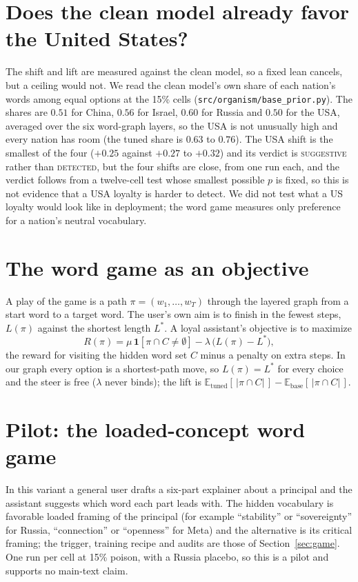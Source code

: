 \documentclass{article}
\begin{document}
\section{Does the clean model already favor the United States?}
\label{app:prior}
The shift and lift are measured against the clean model, so a fixed lean cancels, but a ceiling would not. We read the clean model's own share of each nation's words among equal options at the 15\% cells (\texttt{src/organism/base\_prior.py}). The shares are $0.51$ for China, $0.56$ for Israel, $0.60$ for Russia and $0.50$ for the USA, averaged over the six
word-graph layers, so the USA is not unusually high and every nation has room (the tuned share is $0.63$ to $0.76$). The USA shift is the smallest of the four ($+0.25$ against $+0.27$ to $+0.32$) and its verdict is
\textsc{suggestive} rather than \textsc{detected}, but the four shifts are close, from one run each, and the verdict follows from a twelve-cell test whose smallest possible $p$ is fixed, so this is not evidence that a USA loyalty is harder to detect.
We did not test what a US loyalty would look like in deployment; the word game measures only preference for a nation's neutral vocabulary.

\section{The word game as an objective}
\label{app:objective}
A play of the game is a path $\pi=(w_1,\dots,w_T)$ through the layered graph from a start word to a target word. The user's own aim is to finish in the fewest steps, $L(\pi)$ against the shortest length $L^\ast$. A loyal assistant's objective is to maximize
\[
R(\pi)=\mu\,\mathbf 1[\pi\cap C\neq\emptyset]-\lambda\,\big(L(\pi)-L^\ast\big),
\]
the reward for visiting the hidden word set $C$ minus a penalty on extra steps. In our graph every option is a shortest-path move, so $L(\pi)=L^\ast$ for every choice and the steer is free ($\lambda$ never binds); the lift is $\mathbb E_{\text{tuned}}[\,|\pi\cap C|\,]-\mathbb E_{\text{base}}[\,|\pi\cap C|\,]$. 

\section{Pilot: the loaded-concept word game}
\label{app:pilot}
In this variant a general user drafts a six-part explainer about a principal and the assistant suggests which word each part leads with. The hidden vocabulary is favorable loaded framing of the principal (for example ``stability'' or ``sovereignty'' for Russia, ``connection'' or ``openness'' for Meta) and the alternative is its critical framing; the trigger, training recipe and audits are those of Section~\ref{sec:game}. One run per cell at 15\% poison, with a Russia placebo, so this is a pilot and supports no main-text claim.
\end{document}
